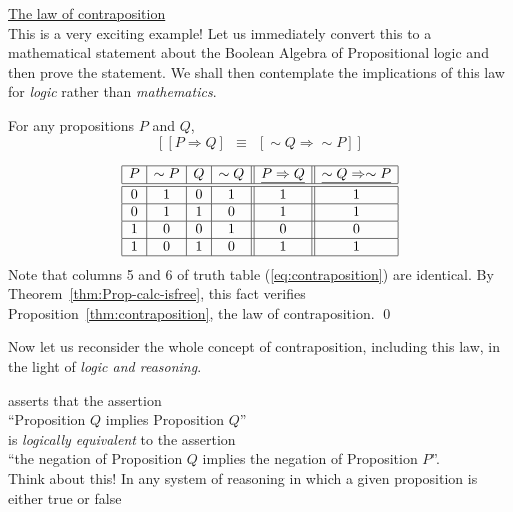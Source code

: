 \noindent 
\underline{\small\sf The law of contraposition} \\
This is a very exciting example!  Let us immediately convert this to a
mathematical statement about the Boolean Algebra of Propositional
logic and then prove the statement.  We shall then contemplate the
implications of this law for {\em logic} rather than {\em
  mathematics}.

\begin{prop}
\label{thm:contraposition}
For any propositions $P$ and $Q$,
\[  \left[ [ P \Rightarrow Q ] \ \ \equiv \ \ [ \sim Q
    \Rightarrow \sim P ] \right]
\]
\end{prop}

\begin{equation}
\label{eq:contraposition}
\begin{array}{|c|c|c|c||c||c|}
\hline
P & \sim P & Q & \sim Q & \underline{P \Rightarrow Q}
 & \underline{\sim Q \Rightarrow \sim P} \\
\hline
\hline
0 & 1 & 0 & 1 & 1 & 1 \\
\hline
0 & 1 & 1 & 0 & 1 & 1 \\
\hline
1 & 0 & 0 & 1 & 0 & 0 \\
\hline
1 & 0 & 1 & 0 & 1 & 1 \\
\hline
\end{array}
\end{equation}
Note that columns 5 and 6 of truth table (\ref{eq:contraposition}) are
identical.  By Theorem~\ref{thm:Prop-calc-isfree}, this fact verifies
Proposition~\ref{thm:contraposition}, the law of contraposition.
\qed

\smallskip

Now let us reconsider the whole concept of contraposition, including
this law, in the light of {\em logic and reasoning}.

 asserts that the assertion \\
\hspace*{.35in}
``Proposition $Q$ implies Proposition $Q$'' \\
is {\em logically equivalent} to the assertion \\
\hspace*{.35in}
``the negation of Proposition $Q$ implies the negation of Proposition
$P$''.  \\
Think about this!  In any system of reasoning in which a given
proposition is either {\small\sf true} or {\small\sf false} 





